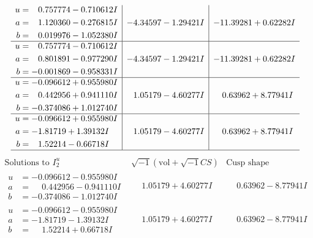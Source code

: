 \documentclass[1p]{elsarticle_modified}
\theoremstyle{definition}
\newcommand{\I}{\sqrt{-1}}
\begin{document}
$$\begin{array}{c|c|c}
\begin{aligned}
u &= \phantom{-}0.757774 - 0.710612 I \\
a &= \phantom{-}1.120360 - 0.276815 I \\
b &= \phantom{-}0.019976 - 1.052380 I\end{aligned}
 & -4.34597 - 1.29421 I & -11.39281 + 0.62282 I \\ \hline\begin{aligned}
u &= \phantom{-}0.757774 - 0.710612 I \\
a &= \phantom{-}0.801891 - 0.977290 I \\
b &= -0.001869 - 0.958331 I\end{aligned}
 & -4.34597 - 1.29421 I & -11.39281 + 0.62282 I \\ \hline\begin{aligned}
u &= -0.096612 + 0.955980 I \\
a &= \phantom{-}0.442956 + 0.941110 I \\
b &= -0.374086 + 1.012740 I\end{aligned}
 & \phantom{-}1.05179 - 4.60277 I & \phantom{-}0.63962 + 8.77941 I \\ \hline\begin{aligned}
u &= -0.096612 + 0.955980 I \\
a &= -1.81719 + 1.39132 I \\
b &= \phantom{-}1.52214 - 0.66718 I\end{aligned}
 & \phantom{-}1.05179 - 4.60277 I & \phantom{-}0.63962 + 8.77941 I\\
 \hline 
 \end{array}$$\newpage$$\begin{array}{c|c|c}  
\text{Solutions to }I^u_{2}& \I (\text{vol} + \sqrt{-1}CS) & \text{Cusp shape}\\
 \hline 
\begin{aligned}
u &= -0.096612 - 0.955980 I \\
a &= \phantom{-}0.442956 - 0.941110 I \\
b &= -0.374086 - 1.012740 I\end{aligned}
 & \phantom{-}1.05179 + 4.60277 I & \phantom{-}0.63962 - 8.77941 I \\ \hline\begin{aligned}
u &= -0.096612 - 0.955980 I \\
a &= -1.81719 - 1.39132 I \\
b &= \phantom{-}1.52214 + 0.66718 I\end{aligned}
 & \phantom{-}1.05179 + 4.60277 I & \phantom{-}0.63962 - 8.77941 I \\ \hline\begin{aligned}

\end{aligned}
\end{array}$$
\end{document}
